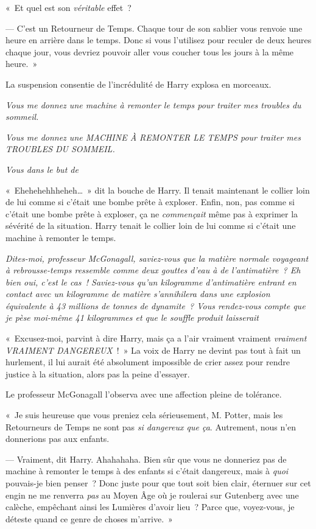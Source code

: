 «~Et quel est son \emph{véritable} effet~?

--- C'est un Retourneur de Temps. Chaque tour de son sablier vous renvoie une heure en arrière dans le temps. Donc si vous l'utilisez pour reculer de deux heures chaque jour, vous devriez pouvoir aller vous coucher tous les jours à la même heure.~»

La suspension consentie de l'incrédulité de Harry explosa en morceaux.

\emph{Vous me donnez une machine à remonter le temps pour traiter mes troubles du sommeil.}

\emph{Vous me donnez une MACHINE À REMONTER LE TEMPS pour traiter mes TROUBLES DU SOMMEIL.}

\emph{Vous  dans le but de }

«~Ehehehehhheheh…~» dit la bouche de Harry. Il tenait maintenant le collier loin de lui comme si c'était une bombe prête à exploser. Enfin, non, pas comme si c'était une bombe prête à exploser, ça ne \emph{commençait} même pas à exprimer la sévérité de la situation. Harry tenait le collier loin de lui comme si c'était une machine à remonter le temps.

\emph{Dites-moi, professeur McGonagall, saviez-vous que la matière normale voyageant à rebrousse-temps ressemble comme deux gouttes d'eau à de l'antimatière~? Eh bien oui, c'est le cas~! Saviez-vous qu'un kilogramme d'antimatière entrant en contact avec un kilogramme de matière s'annihilera dans une explosion équivalente à 43 millions de tonnes de dynamite~? Vous rendez-vous compte que je pèse moi-même 41 kilogrammes et que le souffle produit laisserait }

«~Excusez-moi, parvint à dire Harry, mais ça a l'air vraiment vraiment \emph{vraiment} \emph{VRAIMENT DANGEREUX}~!~» La voix de Harry ne devint pas tout à fait un hurlement, il lui aurait été absolument impossible de crier assez pour rendre justice à la situation, alors pas la peine d'essayer.

Le professeur McGonagall l'observa avec une affection pleine de tolérance.

«~Je suis heureuse que vous preniez cela sérieusement, M. Potter, mais les Retourneurs de Temps ne sont pas \emph{si dangereux que ça}. Autrement, nous n'en donnerions pas aux enfants.

--- Vraiment, dit Harry. Ahahahaha. Bien sûr que vous ne donneriez pas de machine à remonter le temps à des enfants si c'était dangereux, mais à \emph{quoi} pouvais-je bien penser~? Donc juste pour que tout soit bien clair, éternuer sur cet engin ne me renverra \emph{pas} au Moyen Âge où je roulerai sur Gutenberg avec une calèche, empêchant ainsi les Lumières d'avoir lieu~? Parce que, voyez-vous, je déteste quand ce genre de choses m'arrive.~»

